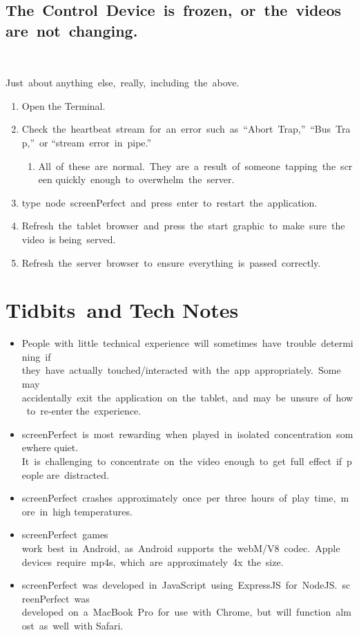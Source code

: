 \subsection{The Control Device is frozen, or the videos are not changing.} 

Just about anything else, really, including the above.
\begin{enumerate}
	\item{Open the Terminal.}
	\item{Check the heartbeat stream for an error such as “Abort Trap,” “Bus Trap,” or “stream error in pipe.”}
	\begin{enumerate}
	\item{All of these are normal. They are a result of someone tapping the screen quickly enough to overwhelm the server.}
	\end{enumerate}
	\item{type node screenPerfect and press enter to restart the application.}
	\item{Refresh the tablet browser and press the start graphic to make sure the video is being served.}
	\item{Refresh the server browser to ensure everything is passed correctly.}
\end{enumerate}

\section{Tidbits and Tech Notes}

\begin{itemize}
	\item{People with little technical experience will sometimes have trouble determining if they have actually touched/interacted with the app appropriately. Some may accidentally exit the application on the tablet, and may be unsure of how to re-enter the experience.}
	\item{screenPerfect is most rewarding when played in isolated concentration somewhere quiet. It is challenging to concentrate on the video enough to get full effect if people are distracted.} 
	\item{screenPerfect crashes approximately once per three hours of play time, more in high temperatures.}
	\item{screenPerfect games work best in Android, as Android supports the webM/V8 codec. Apple devices require mp4s, which are approximately 4x the size.}
	\item{screenPerfect was developed in JavaScript using ExpressJS for NodeJS. screenPerfect was developed on a MacBook Pro for use with Chrome, but will function almost as well with Safari.}
\end{itemize}